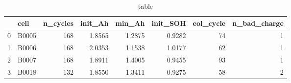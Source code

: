 \begin{table}
\caption{table}
\label{tab:table}
\begin{tabular}{llrrrrrr}
\toprule
 & cell & n\_cycles & init\_Ah & min\_Ah & init\_SOH & eol\_cycle & n\_bad\_charge \\
\midrule
0 & B0005 & 168 & 1.8565 & 1.2875 & 0.9282 & 74 & 1 \\
1 & B0006 & 168 & 2.0353 & 1.1538 & 1.0177 & 62 & 1 \\
2 & B0007 & 168 & 1.8911 & 1.4005 & 0.9455 & 93 & 1 \\
3 & B0018 & 132 & 1.8550 & 1.3411 & 0.9275 & 58 & 2 \\
\bottomrule
\end{tabular}
\end{table}
